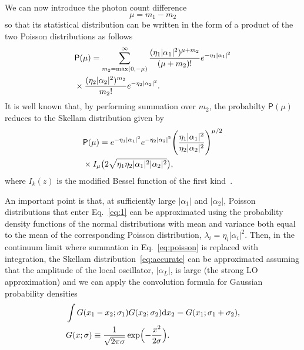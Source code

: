 \documentclass[%
reprint,
superscriptaddress,
 amsmath,amssymb,amsfonts,
 aps,
 pra,
 longbibliography
]{revtex4-2}
\newcommand{\prob}{\mathsf{P}}
\newcommand{\dd}{\mathrm{d}}
\begin{document}
We can now introduce the photon count difference
\begin{equation}
  \label{eq:dleta-m}
    \mu = m_1-m_2
  \end{equation}
  so that its statistical distribution %
  can be written in
  the form of a product of the two Poisson distributions as follows 
\begin{align}
  &
\label{eq:poisson}  
    \prob(\mu) =\sum_{m_2=\max(0,-\mu)}^{\infty}
    \frac{(\eta_1|\alpha_1|^2)^{\mu+m_2}}{(\mu+m_2)!}e^{-\eta_1|\alpha_1|^2}
    \notag
  \\
  &
    \times
\frac{(\eta_2|\alpha_2|^2)^{m_2}}{m_2!}e^{-\eta_2|\alpha_2|^2}.
\end{align}
It is well known that, by performing summation over $m_2$,
the probabilty $\prob(\mu)$ reduces to
the Skellam distribution given by~\cite{skellam1946frequency}
\begin{align}
  &
  \label{eq:accurate}
  \prob(\mu)=e^{-\eta_1|\alpha_1|^2}e^{-\eta_2|\alpha_2|^2}
    \Biggl(\frac{\eta_1|\alpha_1|^2}{\eta_2|\alpha_2|^2}\Biggr)^{\mu/2}
    \notag
  \\
  &
    \times
I_{\mu}\bigl(2\sqrt{\eta_1\eta_2|\alpha_1|^2|\alpha_2|^2}\bigr),
\end{align}
where $I_k(z)$ is the modified Bessel function of the first kind~\cite{NIST:hndbk:2010}.

An important point is that,
at sufficiently large
$|\alpha_1|$ and $|\alpha_2|$,
Poisson distributions that enter Eq.~\eqref{eq:1}
can be approximated using
the probability density functions of the normal distributions
with mean and variance both equal to the mean of
the corresponding Poisson distribution, $\lambda_i=\eta_i |\alpha_i|^2$.
Then, in the continuum limit where
summation in Eq.~\eqref{eq:poisson} is replaced with integration,
the Skellam distribution~\eqref{eq:accurate}
can be approximated assuming
that the amplitude of the local oscillator, $|\alpha_L|$, is large
(the strong LO approximation) and
we can apply the convolution formula
for Gaussian probability densities
\begin{align}
  &
  \label{eq:convolution}
  \int G(x_1-x_2;\sigma_1)G(x_2;\sigma_2)\dd
    x_2=G(x_1;\sigma_1+\sigma_2),
  \\
  &
    \label{eq:G-notation}
    G(x;\sigma)\equiv\frac{1}{\sqrt{2\pi\sigma}}\exp\Bigl(-\frac{x^2}{2\sigma}\Bigr).
\end{align}
\end{document}
